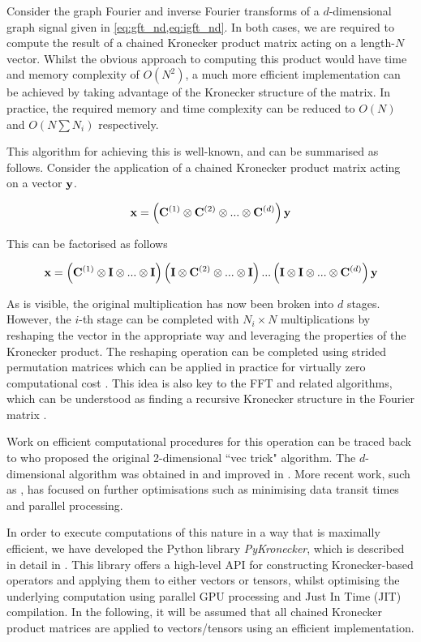 \label{sec:fast_kron_dd}

Consider the graph Fourier and inverse Fourier transforms of a $d$-dimensional graph signal given in \cref{eq:gft_nd,eq:igft_nd}. In both cases, we are required to compute the result of a chained Kronecker product matrix acting on a length-$N$ vector. Whilst the obvious approach to computing this product would have time and memory complexity of $O(N^2)$, a much more efficient implementation can be achieved by taking advantage of the Kronecker structure of the matrix. In practice, the required memory and time complexity can be reduced to $O(N)$ and $O(N\sum N_i)$ respectively. 

This algorithm for achieving this is well-known, and can be summarised as follows. Consider the application of a chained Kronecker product matrix acting on a vector $\mathbf{y}$. 

$$
\mathbf{x} = \left( \mathbf{C}^{(1)} \otimes \mathbf{C}^{(2)} \otimes ... \otimes \mathbf{C}^{(d)}\right) \mathbf{y}
$$

This can be factorised as follows

$$
\mathbf{x} = \left( \mathbf{C}^{(1)} \otimes \mathbf{I} \otimes ... \otimes \mathbf{I} \right)\left( \mathbf{I} \otimes \mathbf{C}^{(2)} \otimes ... \otimes \mathbf{I} \right) ... \left( \mathbf{I} \otimes \mathbf{I} \otimes ... \otimes \mathbf{C}^{(d)} \right) \mathbf{y}
$$

As is visible, the original multiplication has now been broken into $d$ stages. However, the $i$-th stage can be completed with $N_i \times N$ multiplications by reshaping the vector in the appropriate way and leveraging the properties of the Kronecker product. The reshaping operation can be completed using strided permutation matrices which can be applied in practice for virtually zero computational cost \citep{Granata1992}. This idea is also key to the FFT and related algorithms, which can be understood as finding a recursive Kronecker structure in the Fourier matrix \citep{Tolimieri2013}. 

Work on efficient computational procedures for this operation can be traced back to \cite{Roth1934} who proposed the original 2-dimensional ``vec trick" algorithm. The $d$-dimensional algorithm was obtained in \cite{Pereyra1973} and improved in \cite{DeBoor1979}. More recent work, such as \cite{Fackler2019}, has focused on further optimisations such as minimising data transit times and parallel processing. 

In order to execute computations of this nature in a way that is maximally efficient, we have developed the Python library \textit{PyKronecker}, which is described in detail in \cite{Antonian2023}. This library offers a high-level API for constructing Kronecker-based operators and applying them to either vectors or tensors, whilst optimising the underlying computation using parallel GPU processing and Just In Time (JIT) compilation. In the following, it will be assumed that all chained Kronecker product matrices are applied to vectors/tensors using an efficient implementation. 


